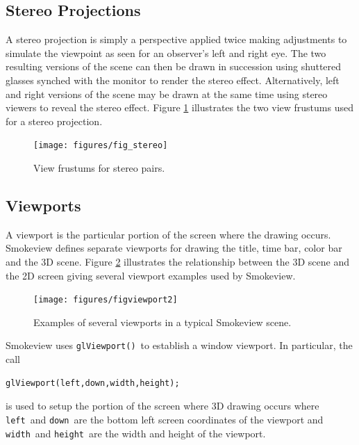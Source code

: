 \documentclass[11pt,twoside]{book}
\newcommand{\figoptions}{htp}
\begin{document}
\subsection{Stereo Projections}

A stereo projection is simply a perspective applied twice making adjustments to simulate the viewpoint as seen for an observer's left and right eye.  The two resulting versions of the
scene can then be drawn in succession using shuttered glasses synched with the monitor to render the stereo effect.  Alternatively, left and right versions of the scene may be drawn at the same time using stereo viewers to reveal the stereo effect.  Figure \ref{figstereo} illustrates the two view frustums used for a stereo projection.

\begin{figure}[\figoptions]
\begin{center}
\texttt{[image: figures/fig\_stereo]}
\end{center}
\caption{View frustums for stereo pairs.}
 \label{figstereo}
\end{figure}

\subsection{Viewports}
A viewport is the particular portion of the screen where the drawing
occurs.  Smokeview defines separate viewports for drawing the
title, time bar, color bar and the 3D scene.  Figure
\ref{figviewports} illustrates the relationship between the 3D
scene and the 2D screen giving several viewport examples used by
Smokeview.
\begin{figure}[\figoptions]
\begin{center}
\texttt{[image: figures/figviewport2]}
\end{center}
\caption{Examples of several viewports in a typical Smokeview scene.}
 \label{figviewports}
\end{figure}

Smokeview uses {\tt glViewport()}\ to establish a window viewport.  In particular, the call
\begin{verbatim}
glViewport(left,down,width,height);
\end{verbatim}
is used to setup the portion of the screen where 3D drawing occurs where {\tt left}\
and {\tt down}\ are the bottom left screen coordinates of the viewport and {\tt width}\
and {\tt height}\ are the width and height of the viewport.

%
%
\end{document}
